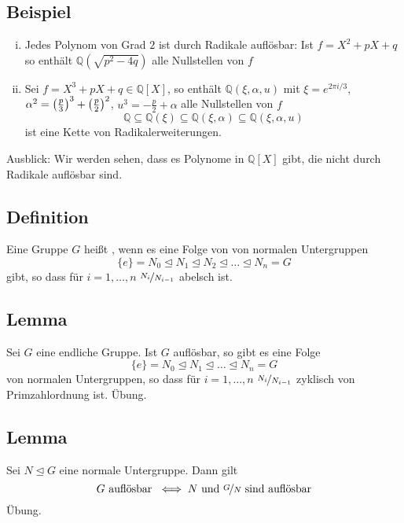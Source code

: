 \subsection[Beispiele für durch Radikale auflösbare Polynome]{Beispiel} %
\label{sub:1210}
\begin{enumerate}[(i)]
	\item Jedes Polynom von Grad $2$ ist durch Radikale auflösbar: Ist $f=X^2+ pX +q$ so enthält $\mathds{Q}(\sqrt{p^2- 4q}  )$ alle Nullstellen von $f$
	\item Sei $f = X^3+ pX+q \in \mathds{Q}[X]$, so enthält $\mathds{Q}(\xi, \alpha, u)$ mit $\xi= e^{2 \pi i /3}$, 
	$\alpha^2= \enbrace*{\frac{p}{3} }^3+ \enbrace*{\frac{p}{2} }^2 $, $u^3= -\frac{p}{2}+ \alpha $ alle Nullstellen von $f$
	\[
		\mathds{Q}\subseteq \mathds{Q}(\xi) \subseteq  \mathds{Q}(\xi, \alpha) \subseteq \mathds{Q}(\xi,\alpha,u)
	\] 
	ist eine Kette von Radikalerweiterungen.
\end{enumerate}
Ausblick: Wir werden sehen, dass es Polynome in $\mathds{Q}[X]$ gibt, die nicht durch Radikale auflösbar sind.

\subsection[Definition: auflösbare Gruppe]{Definition} %
\label{sub:1211}
Eine Gruppe $G$ heißt , wenn es eine Folge von von normalen Untergruppen
\[
	\{e\} = N_0 \unlhd N_1 \unlhd N_2 \unlhd \ldots \unlhd N_n = G
\]
gibt, so dass für $i=1, \ldots ,n$ $\nicefrac{N_i}{N_{i-1}}$ abelsch ist.

\subsection[Lemma: Eigenschaft von auflösbaren endlichen Gruppen]{Lemma} %
\label{sub:1212}
Sei $G$ eine endliche Gruppe. Ist $G$ auflösbar, so gibt es eine Folge 
\[
	\{e\} = N_0 \unlhd N_1 \unlhd \ldots \unlhd N_n = G
\]
von normalen Untergruppen, so dass für $i=1,\ldots ,n$ $\nicefrac{N_i}{N_{i-1}}$ zyklisch von Primzahlordnung ist.
Übung.

\subsection[Lemma:Äquivalente Aussage zu $G$ ist auflösbar]{Lemma} %
\label{sub:1213}
Sei $N \unlhd G$ eine normale Untergruppe. Dann gilt
\[
	G \text{ auflösbar } \iff N \text{ und } \nicefrac{G}{N} \text{ sind auflösbar}
\]
Übung.


